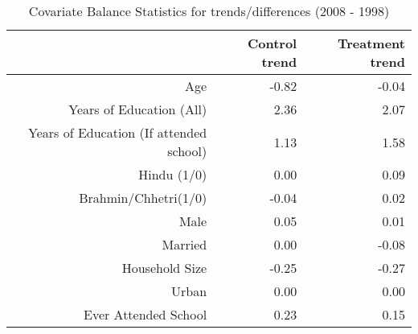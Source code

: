 \begin{table}[ht]
\centering
\begin{tabular}{rrr}
  \toprule
 & Control trend & Treatment trend \\ 
  \midrule
Age & -0.82 & -0.04 \\ 
  Years of Education (All) & 2.36 & 2.07 \\ 
  Years of Education (If attended school) & 1.13 & 1.58 \\ 
  Hindu (1/0) & 0.00 & 0.09 \\ 
  Brahmin/Chhetri(1/0) & -0.04 & 0.02 \\ 
  Male & 0.05 & 0.01 \\ 
  Married & 0.00 & -0.08 \\ 
  Household Size & -0.25 & -0.27 \\ 
  Urban & 0.00 & 0.00 \\ 
  Ever Attended School & 0.23 & 0.15 \\ 
   \bottomrule
\end{tabular}
\caption{Covariate Balance Statistics for trends/differences (2008 - 1998)} 
\end{table}

